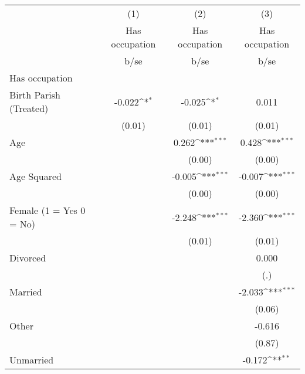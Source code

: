 {
\def\sym#1{\ifmmode^{#1}\else\(^{#1}\)\fi}
\begin{tabular}{l*{3}{c}}
\hline\hline
                    &\multicolumn{1}{c}{(1)}&\multicolumn{1}{c}{(2)}&\multicolumn{1}{c}{(3)}\\
                    &\multicolumn{1}{c}{Has occupation}&\multicolumn{1}{c}{Has occupation}&\multicolumn{1}{c}{Has occupation}\\
                    &        b/se         &        b/se         &        b/se         \\
\hline
Has occupation      &                     &                     &                     \\
Birth Parish (Treated)&      -0.022\sym{*}  &      -0.025\sym{*}  &       0.011         \\
                    &      (0.01)         &      (0.01)         &      (0.01)         \\
Age                 &                     &       0.262\sym{***}&       0.428\sym{***}\\
                    &                     &      (0.00)         &      (0.00)         \\
Age Squared         &                     &      -0.005\sym{***}&      -0.007\sym{***}\\
                    &                     &      (0.00)         &      (0.00)         \\
Female (1 = Yes 0 = No)&                     &      -2.248\sym{***}&      -2.360\sym{***}\\
                    &                     &      (0.01)         &      (0.01)         \\
Divorced            &                     &                     &       0.000         \\
                    &                     &                     &         (.)         \\
Married             &                     &                     &      -2.033\sym{***}\\
                    &                     &                     &      (0.06)         \\
Other               &                     &                     &      -0.616         \\
                    &                     &                     &      (0.87)         \\
Unmarried           &                     &                     &      -0.172\sym{**} \\

\end{tabular}}
